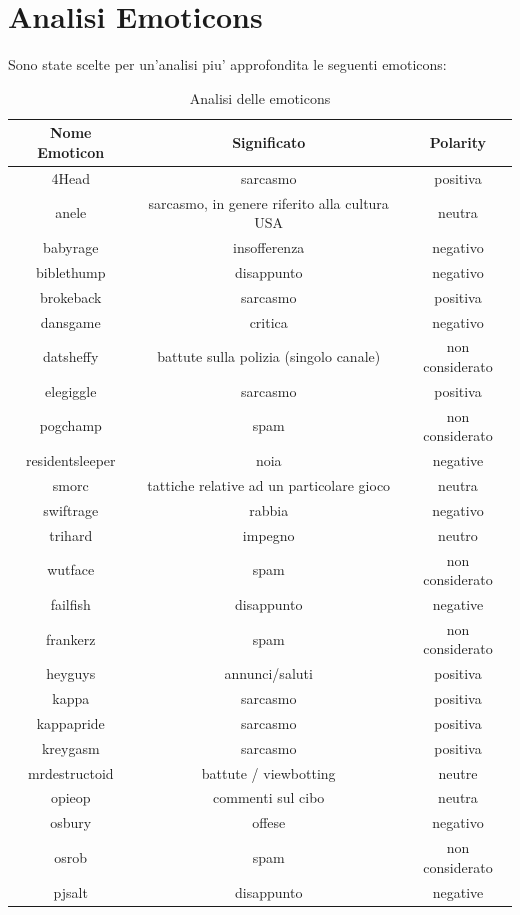 \documentclass[a4paper,11pt]{book}
\theoremstyle{definition}
\begin{document}
\section{Analisi Emoticons}
Sono state scelte per un'analisi piu' approfondita le seguenti emoticons:
\begin{table}[h]
\begin{center}
\begin{tabular}{|c|c|c|}
\hline
Nome Emoticon & Significato & Polarity \\
\hline
\hline
4Head & sarcasmo & positiva \\
\hline
anele & sarcasmo, in genere riferito alla cultura USA & neutra \\
\hline
babyrage & insofferenza & negativo \\
\hline
biblethump & disappunto & negativo \\
\hline
brokeback & sarcasmo & positiva \\
\hline
dansgame & critica & negativo \\
\hline
datsheffy & battute sulla polizia (singolo canale) & non considerato \\
\hline
elegiggle & sarcasmo & positiva \\
\hline
pogchamp & spam & non considerato \\
\hline
residentsleeper & noia & negative \\
\hline
smorc & tattiche relative ad un particolare gioco & neutra \\
\hline
swiftrage & rabbia & negativo \\
\hline
trihard & impegno &  neutro \\
\hline
wutface & spam & non considerato \\
\hline
failfish & disappunto & negative \\
\hline
frankerz & spam & non considerato \\
\hline
heyguys & annunci/saluti & positiva \\
\hline
kappa & sarcasmo & positiva \\
\hline
kappapride & sarcasmo & positiva \\
\hline
kreygasm & sarcasmo & positiva \\
\hline
mrdestructoid & battute / viewbotting & neutre \\
\hline
opieop & commenti sul cibo & neutra \\
\hline
osbury & offese & negativo \\
\hline
osrob & spam & non considerato \\
\hline
pjsalt & disappunto & negative \\
\hline
\end{tabular}
\end{center}
\caption{Analisi delle emoticons}
\label{tab:emoticons1}
\end{table}
\end{document}

